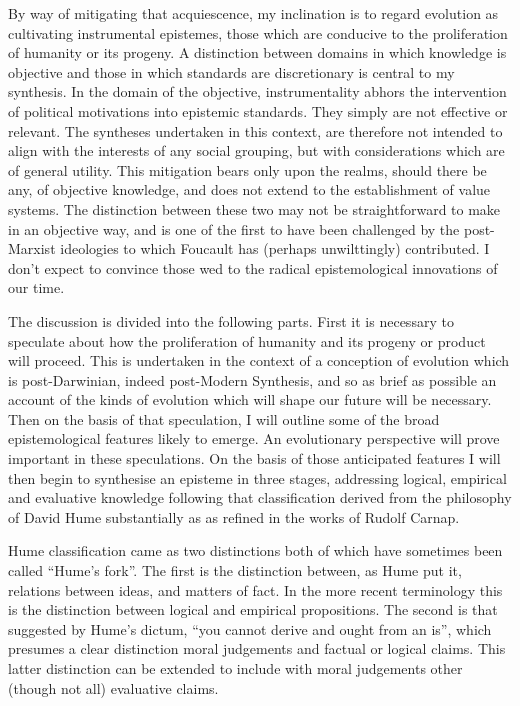\documentclass[10pt,titlepage]{article}
\begin{document}
By way of mitigating that acquiescence, my inclination is to regard evolution as cultivating instrumental epistemes, those which are conducive to the proliferation of humanity or its progeny.
A distinction between domains in which knowledge is objective and those in which standards are discretionary is central to my synthesis.
In the domain of the objective, instrumentality abhors the intervention of political motivations into epistemic standards.
They simply are not effective or relevant.
The syntheses undertaken in this context, are therefore not intended to align with the interests of any social grouping, but with considerations which are of general utility.
This mitigation bears only upon the realms, should there be any, of objective knowledge, and does not extend to the establishment of value systems.
The distinction between these two may not be straightforward to make in an objective way, and is one of the first to have been challenged by the post-Marxist ideologies to which Foucault has (perhaps unwilttingly) contributed.
I don't expect to convince those wed to the radical epistemological innovations of our time.

The discussion is divided into the following parts.
First it is necessary to speculate about how the proliferation of humanity and its progeny or product will proceed.
This is undertaken in the context of a conception of evolution which is post-Darwinian, indeed post-Modern Synthesis, and so as brief as possible an account of the kinds of evolution which will shape our future will be necessary.
Then on the basis of that speculation, I will outline some of the broad epistemological features likely to emerge.
An evolutionary perspective will prove important in these speculations.
On the basis of those anticipated features I will then begin to synthesise an episteme in three stages, addressing logical, empirical and evaluative knowledge following that classification derived from the philosophy of David Hume substantially as as refined in the works of Rudolf Carnap.

Hume classification came as two distinctions both of which have sometimes been called ``Hume's fork''.
The first is the distinction between, as Hume put it, relations between ideas, and matters of fact.
In the more recent terminology this is the distinction between logical and empirical propositions.
The second is that suggested by Hume's dictum, ``you cannot derive and ought from an is'', which presumes a clear distinction moral judgements and factual or logical claims.
This latter distinction can be extended to include with moral judgements other (though not all) evaluative claims.
\end{document}
